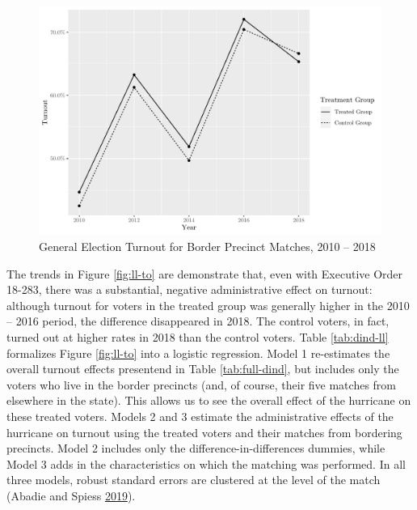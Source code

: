 \documentclass[
  12pt,
]{article}
\begin{document}
\begin{figure}[H]

{\centering \includegraphics{hurricane_michael_files/figure-latex/ll-to-chunk-1} 

}

\caption{\label{fig:ll-to}General Election Turnout for Border Precinct Matches, 2010 -- 2018}\label{fig:ll-to-chunk}
\end{figure}

The trends in Figure \ref{fig:ll-to} are demonstrate that, even with Executive Order 18-283, there was a substantial, negative administrative effect on turnout: although turnout for voters in the treated group was generally higher in the 2010 -- 2016 period, the difference disappeared in 2018. The control voters, in fact, turned out at higher rates in 2018 than the control voters. Table \ref{tab:dind-ll} formalizes Figure \ref{fig:ll-to} into a logistic regression. Model 1 re-estimates the overall turnout effects presentend in Table \ref{tab:full-dind}, but includes only the voters who live in the border precincts (and, of course, their five matches from elsewhere in the state). This allows us to see the overall effect of the hurricane on these treated voters. Models 2 and 3 estimate the administrative effects of the hurricane on turnout using the treated voters and their matches from bordering precincts. Model 2 includes only the difference-in-differences dummies, while Model 3 adds in the characteristics on which the matching was performed. In all three models, robust standard errors are clustered at the level of the match (Abadie and Spiess \protect\hyperlink{ref-Abadie2019}{2019}).

\begin{singlespace}


\end{singlespace}
\end{document}
